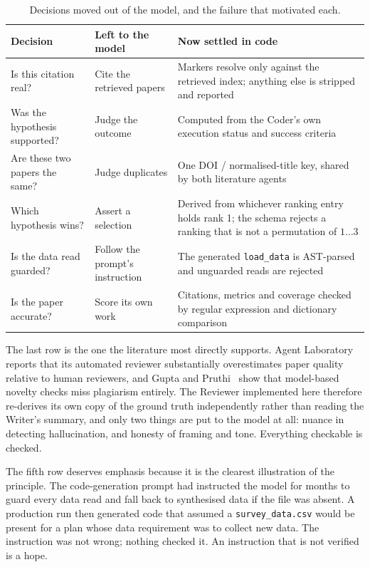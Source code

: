 \begin{table}[htbp]
\centering\small
\caption{Decisions moved out of the model, and the failure that motivated each.}
\label{tab:determinism}
\begin{tabularx}{\textwidth}{lXX}
\toprule
\textbf{Decision} & \textbf{Left to the model} & \textbf{Now settled in code} \\
\midrule
Is this citation real?
  & Cite the retrieved papers
  & Markers resolve only against the retrieved index; anything else is stripped and reported \\
Was the hypothesis supported?
  & Judge the outcome
  & Computed from the Coder's own execution status and success criteria \\
Are these two papers the same?
  & Judge duplicates
  & One DOI / normalised-title key, shared by both literature agents \\
Which hypothesis wins?
  & Assert a selection
  & Derived from whichever ranking entry holds rank 1; the schema rejects a ranking that is
    not a permutation of $1\ldots3$ \\
Is the data read guarded?
  & Follow the prompt's instruction
  & The generated \texttt{load\_data} is AST-parsed and unguarded reads are rejected \\
Is the paper accurate?
  & Score its own work
  & Citations, metrics and coverage checked by regular expression and dictionary comparison \\
\bottomrule
\end{tabularx}
\end{table}

The last row is the one the literature most directly supports. Agent
Laboratory~\cite{schmidgall2025agentlab} reports that its automated reviewer substantially
overestimates paper quality relative to human reviewers, and Gupta and
Pruthi~\cite{gupta2025glitters} show that model-based novelty checks miss plagiarism entirely.
The Reviewer implemented here therefore re-derives its own copy of the ground truth
independently rather than reading the Writer's summary, and only two things are put to the
model at all: nuance in detecting hallucination, and honesty of framing and tone. Everything
checkable is checked.

The fifth row deserves emphasis because it is the clearest illustration of the principle. The
code-generation prompt had instructed the model for months to guard every data read and fall
back to synthesised data if the file was absent. A production run then generated code that
assumed a \texttt{survey\_data.csv} would be present for a plan whose data requirement was to
collect new data. The instruction was not wrong; nothing checked it. An instruction that is
not verified is a hope.

